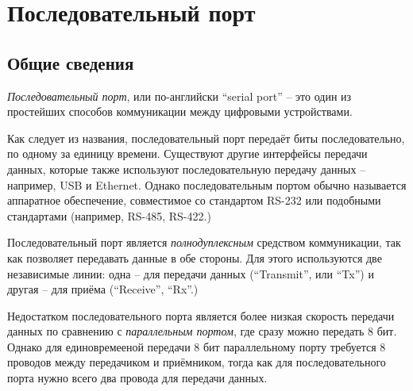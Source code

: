 \documentclass[../sparc.tex]{subfiles}
\begin{document}
\section{Последовательный порт}
\label{section:serial-port}

\subsection{Общие сведения}

\emph{Последовательный порт}, или по-английски ``serial port'' -- это один из
простейших способов коммуникации между цифровыми устройствами.

Как следует из названия, последовательный порт передаёт биты последовательно, по
одному за единицу времени.  Существуют другие интерфейсы передачи данных,
которые также используют последовательную передачу данных -- например, USB и
Ethernet.  Однако последовательным портом обычно называется аппаратное
обеспечение, совместимое со стандартом RS-232 или подобными стандартами
(например, RS-485, RS-422.)

Последовательный порт является \emph{полнодуплексным} средством коммуникации,
так как позволяет передавать данные в обе стороны.  Для этого используются две
независимые линии: одна -- для передачи данных (``Transmit'', или ``Tx'') и
другая -- для приёма (``Receive'', ``Rx''.)

Недостатком последовательного порта является более низкая скорость передачи
данных по сравнению с \emph{параллельным портом}, где сразу можно передать 8
бит.  Однако для единовремееной передачи 8 бит параллельному порту требуется 8
проводов между передачиком и приёмником, тогда как для последовательного порта
нужно всего два провода для передачи данных.
\end{document}
